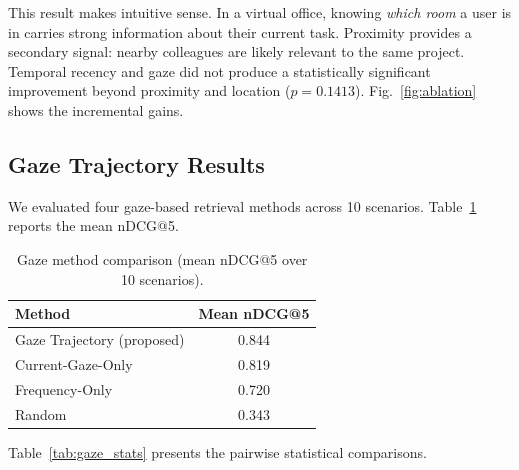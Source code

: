 \documentclass[journal]{IEEEtran}
\begin{document}
This result makes intuitive sense. In a virtual office, knowing \emph{which room} a user is in carries strong information about their current task. Proximity provides a secondary signal: nearby colleagues are likely relevant to the same project. Temporal recency and gaze did not produce a statistically significant improvement beyond proximity and location ($p = 0.1413$). Fig.~\ref{fig:ablation} shows the incremental gains.

\subsection{Gaze Trajectory Results}
\label{subsec:gaze}

We evaluated four gaze-based retrieval methods across 10 scenarios. Table~\ref{tab:gaze_methods} reports the mean nDCG@5.

\begin{table}[htbp]
\centering
\caption{Gaze method comparison (mean nDCG@5 over 10 scenarios).}
\label{tab:gaze_methods}
\begin{tabular}{lc}
\hline
\textbf{Method} & \textbf{Mean nDCG@5} \\
\hline
Gaze Trajectory (proposed) & 0.844 \\
Current-Gaze-Only          & 0.819 \\
Frequency-Only             & 0.720 \\
Random                     & 0.343 \\
\hline
\end{tabular}
\end{table}

Table~\ref{tab:gaze_stats} presents the pairwise statistical comparisons.

\begin{table}[htbp]
\centering
\caption{Pairwise statistical tests between gaze methods ($\text{df} = 9$).}
\label{tab:gaze_stats}
\end{table}
\end{document}
